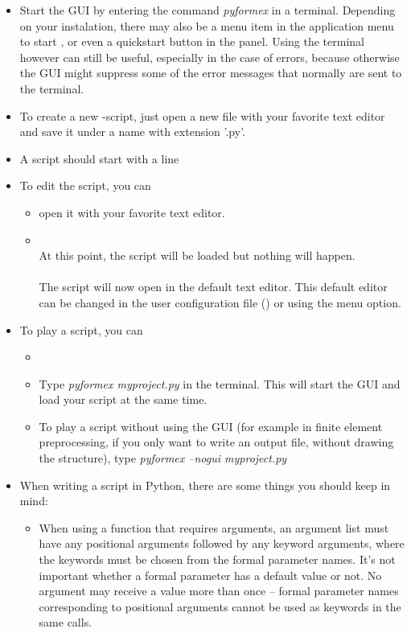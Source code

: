 \begin{itemize}
\item Start the \pyformex GUI by entering the command \emph{pyformex} in a terminal. Depending on your instalation, there may also be a menu item in the application menu to start \pyf, or even a quickstart button in the panel. Using the terminal however can still be useful, especially in the case of errors, because otherwise the GUI might suppress some of the error messages that normally are sent to the terminal.
\item To create a new \pyformex-script, just open a new file with your favorite text editor and save it under a name with extension '.py'.
\item A \pyf script should start with a line 
\item To edit the script, you can
	\begin{itemize}
	\item open it with your favorite text editor.
	\item {}\\
	At this point, the script will be loaded but nothing will happen. \\
	\\
	The script will now open in the default text editor. This default editor can be changed in the user configuration file () or using the  menu option.
	\end{itemize}
\item To play a script, you can
	\begin{itemize}
	\item {}\\
	\item Type \emph{pyformex myproject.py} in the terminal. This will start the \pyformex GUI and load your script at the same time. \\
	\item To play a script without using the GUI (for example in finite element preprocessing, if you only want to write an 		output file, without drawing the structure), type \emph{pyformex --nogui myproject.py}
	\end{itemize}
\item When writing a script in Python, there are some things you should keep in mind:
	\begin{itemize}
	\item When using a function that requires arguments, an argument list must have any positional arguments followed by any keyword arguments, where the keywords must be chosen from the formal parameter names. It's not important whether a formal parameter has a default value or not. No argument may receive a value more than once -- formal parameter names corresponding to positional arguments cannot be used as keywords in the same calls. 


\end{itemize}
\end{itemize}
